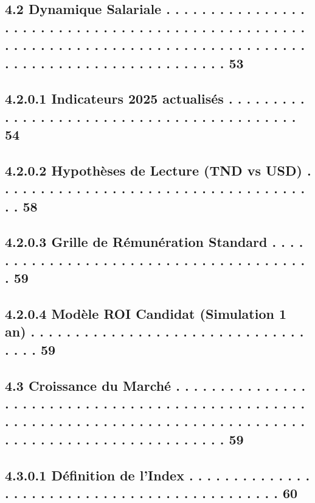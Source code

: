 \subsection{4.2     Dynamique Salariale . . . . . . . . . . . . . . . . . . . . . . . . . . . . . . . . . . . . . . . . . . . . . . . . . . . . . . . . . . . . . . . . . . . . . . . . . . . . . . . . . . . . . . . . . . . . . . . . . . . . . . . . . . . . . 53}
\subsection{4.2.0.1 Indicateurs 2025 actualisés . . . . . . . . . . . . . . . . . . . . . . . . . . . . . . . . . . . . . . . . . .                                                                                                                  54}
\subsection{4.2.0.2 Hypothèses de Lecture (TND vs USD) . . . . . . . . . . . . . . . . . . . . . . . . . . . . . . . . . . . . .                                                                                                                     58}
\subsection{4.2.0.3 Grille de Rémunération Standard . . . . . . . . . . . . . . . . . . . . . . . . . . . . . . . . . . . . . . .                                                                                                                    59}
\subsection{4.2.0.4 Modèle ROI Candidat (Simulation 1 an) . . . . . . . . . . . . . . . . . . . . . . . . . . . . . . . . . . .                                                                                                                      59}
\subsection{4.3     Croissance du Marché . . . . . . . . . . . . . . . . . . . . . . . . . . . . . . . . . . . . . . . . . . . . . . . . . . . . . . . . . . . . . . . . . . . . . . . . . . . . . . . . . . . . . . . . . . . . . . . . . . . . . . . . . . . . 59}
\subsection{4.3.0.1           Définition de l’Index . . . . . . . . . . . . . . . . . . . . . . . . . . . . . . . . . . . . . . . . . . . . .                                                                                                        60}
